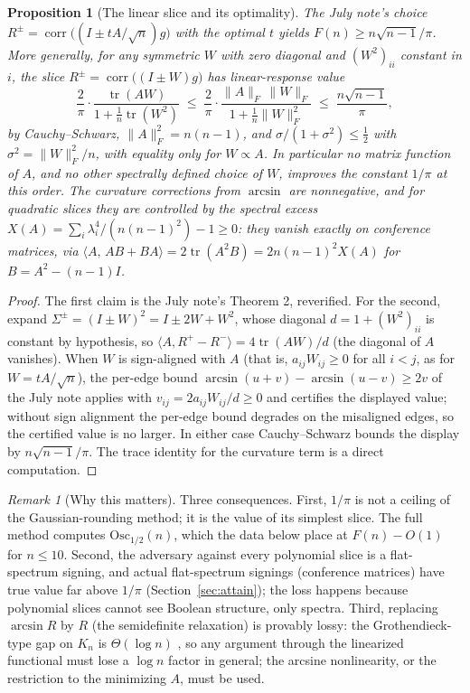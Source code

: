 \documentclass[11pt]{article}
\newtheorem{proposition}[theorem]{Proposition}
\theoremstyle{remark}
\newtheorem{remark}[theorem]{Remark}
\newcommand{\Osc}{\mathrm{Osc}}
\begin{document}
\begin{proposition}[The linear slice and its optimality]\label{prop:slice}
The July note's choice
$R^\pm=\operatorname{corr}\bigl((I\pm tA/\sqrt n)g\bigr)$ with the
optimal $t$ yields $F(n)\ge n\sqrt{n-1}/\pi$. More generally, for any
symmetric $W$ with zero diagonal and $(W^2)_{ii}$ constant in $i$,
the slice $R^\pm=\operatorname{corr}\bigl((I\pm W)g\bigr)$ has
linear-response value
\[
 \frac2\pi\cdot
 \frac{\operatorname{tr}(AW)}
      {1+\tfrac1n\operatorname{tr}(W^2)}
 \;\le\;\frac2\pi\cdot
 \frac{\|A\|_F\,\|W\|_F}{1+\tfrac1n\|W\|_F^2}
 \;\le\;\frac{n\sqrt{n-1}}\pi ,
\]
by Cauchy--Schwarz, $\|A\|_F^2=n(n-1)$, and
$\sigma/(1+\sigma^2)\le\tfrac12$ with $\sigma^2=\|W\|_F^2/n$, with
equality only for $W\propto A$. In particular no matrix function of
$A$, and no other spectrally defined choice of $W$, improves the
constant $1/\pi$ at this order. The curvature corrections from
$\arcsin$ are nonnegative, and for quadratic slices they are
controlled by the spectral excess
$X(A)=\sum_i\lambda_i^4/(n(n-1)^2)-1\ge0$: they vanish exactly on
conference matrices, via
$\bigl\langle A,\,A B+BA\bigr\rangle=2\operatorname{tr}(A^2B)
=2n(n-1)^2X(A)$ for $B=A^2-(n-1)I$.
\end{proposition}
\begin{proof}
The first claim is the July note's Theorem 2, reverified. For the
second, expand $\Sigma^\pm=(I\pm W)^2=I\pm2W+W^2$, whose diagonal
$d=1+(W^2)_{ii}$ is constant by hypothesis, so
$\langle A,R^+-R^-\rangle=4\operatorname{tr}(AW)/d$ (the diagonal of
$A$ vanishes). When $W$ is sign-aligned with $A$
(that is, $a_{ij}W_{ij}\ge0$ for all $i<j$, as for $W=tA/\sqrt n$),
the per-edge bound $\arcsin(u+v)-\arcsin(u-v)\ge2v$ of the July note
applies with $v_{ij}=2a_{ij}W_{ij}/d\ge0$ and certifies the displayed
value; without sign alignment the per-edge bound degrades on the
misaligned edges, so the certified value is no larger. In either case
Cauchy--Schwarz bounds the display by $n\sqrt{n-1}/\pi$. The trace
identity for the curvature term is a direct computation.
\end{proof}

\begin{remark}[Why this matters]
Three consequences. First, $1/\pi$ is not a ceiling of the
Gaussian-rounding method; it is the value of its simplest slice. The
full method computes $\Osc_{1/2}(n)$, which the data below place at
$F(n)-O(1)$ for $n\le10$. Second, the adversary against every
polynomial slice is a flat-spectrum signing, and actual flat-spectrum
signings (conference matrices) have true value far above $1/\pi$
(Section~\ref{sec:attain}); the loss happens because polynomial slices
cannot see Boolean structure, only spectra. Third, replacing
$\arcsin R$ by $R$ (the semidefinite relaxation) is provably lossy:
the Grothendieck-type gap on $K_n$ is $\Theta(\log n)$
\cite{ammn,charikar-wirth}, so any argument through the linearized
functional must lose a $\log n$ factor in general; the arcsine
nonlinearity, or the restriction to the minimizing $A$, must be used.
\end{remark}
\end{document}
